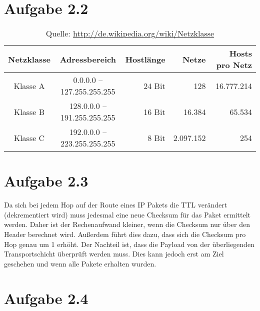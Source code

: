 \documentclass[german,12pt,a4paper]{article}
\begin{document}
\section*{Aufgabe 2.2}
\begin{table}[h]
	\begin{tabular}{|c|c|r|r|r|}\hline
		Netzklasse & Adressbereich               & Hostlänge & Netze      & Hosts pro Netz \\\hline
		Klasse A   &   0.0.0.0 – 127.255.255.255 & 24 Bit    &	      128	& 16.777.214     \\
		Klasse B   & 128.0.0.0 – 191.255.255.255 & 16 Bit    &	   16.384 &	    65.534     \\
		Klasse C   & 192.0.0.0 – 223.255.255.255 & 	8 Bit    &	2.097.152	&        254     \\\hline
	\end{tabular}
	\caption{Quelle: \url{http://de.wikipedia.org/wiki/Netzklasse}}
\end{table}


\section*{Aufgabe 2.3}
Da sich bei jedem Hop auf der Route eines IP Pakets die TTL verändert (dekrementiert wird) muss
jedesmal eine neue Checksum für das Paket ermittelt werden. Daher ist der Rechenaufwand kleiner,
wenn die Checksum nur über den Header berechnet wird. Außerdem führt dies dazu, dass sich die
Checksum pro Hop genau um 1 erhöht. Der Nachteil ist, dass die Payload von der überliegenden
Transportschicht überprüft werden muss. Dies kann jedoch erst am Ziel geschehen und wenn alle Pakete
erhalten wurden.


\section*{Aufgabe 2.4}
\end{document}
